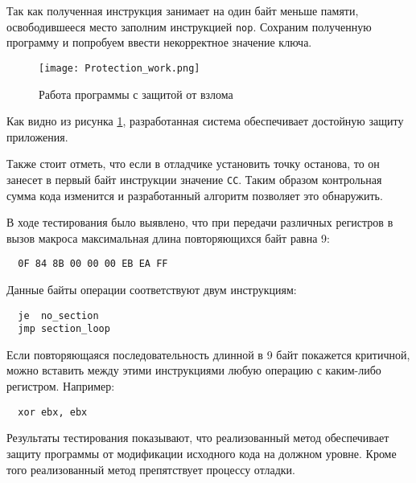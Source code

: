 Так как полученная инструкция занимает на один байт меньше памяти,
освободившееся место заполним инструкцией \verb!nop!. Сохраним полученную
программу и попробуем ввести некорректное значение ключа.

\begin{figure}[hpbt]
  \centering
  \texttt{[image: Protection\_work.png]}
  \caption{Работа программы с защитой от взлома}
  \label{fig:protection_work}
\end{figure}

Как видно из рисунка \ref{fig:protection_work}, разработанная система
обеспечивает достойную защиту приложения.

Также стоит отметь, что если в отладчике установить точку останова, то он
занесет в первый байт инструкции значение \verb!CC!. Таким образом контрольная
сумма кода изменится и разработанный алгоритм позволяет это обнаружить.

В ходе тестирования было выявлено, что при передачи различных регистров в
вызов макроса максимальная длина повторяющихся байт равна 9:
\begin{verbatim}
  0F 84 8B 00 00 00 EB EA FF
\end{verbatim}

Данные байты операции соответствуют двум инструкциям:
\begin{verbatim}
  je  no_section
  jmp section_loop
\end{verbatim}

Если повторяющаяся последовательность длинной в 9 байт покажется критичной,
можно вставить между этими инструкциями любую операцию с каким-либо регистром.
Например:
\begin{verbatim}
  xor ebx, ebx
\end{verbatim}

Результаты тестирования показывают, что реализованный метод обеспечивает защиту
программы от модификации исходного кода на должном уровне. Кроме того
реализованный метод препятствует процессу отладки. 
